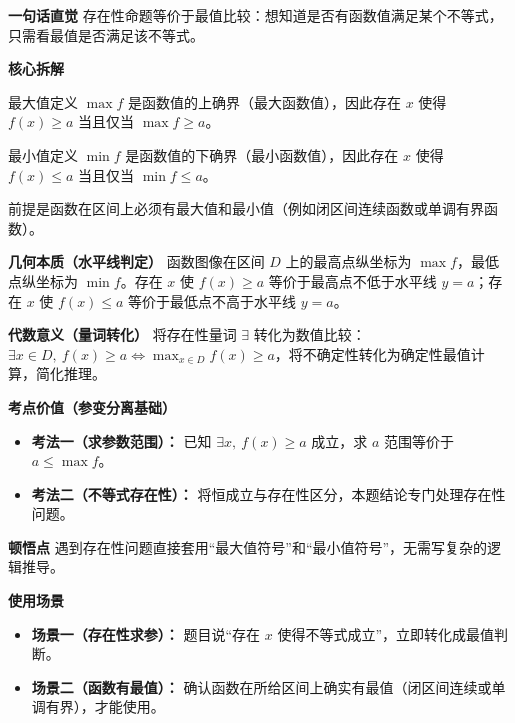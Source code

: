 \begin{explanationbox}
	\textbf{\textcolor{CExplanation}{一句话直觉}}
	存在性命题等价于最值比较：想知道是否有函数值满足某个不等式，只需看最值是否满足该不等式。

	\medskip
	\textbf{\textcolor{CExplanation}{核心拆解}}
	\begin{description}[style=nextline, leftmargin=2.8em, labelsep=0.5em, itemsep=0.45em]
		\item[\textbf{要点一（等价本质）：}]
			最大值定义 $\max f$ 是函数值的上确界（最大函数值），因此存在 $x$ 使得 $f(x)\ge a$ 当且仅当 $\max f\ge a$。
		\item[\textbf{要点二（对称关系）：}]
			最小值定义 $\min f$ 是函数值的下确界（最小函数值），因此存在 $x$ 使得 $f(x)\le a$ 当且仅当 $\min f\le a$。
		\item[\textbf{要点三（适用前提）：}]
			前提是函数在区间上必须有最大值和最小值（例如闭区间连续函数或单调有界函数）。
	\end{description}

	\medskip
	\textbf{\textcolor{CExplanation}{几何本质（水平线判定）}}
	函数图像在区间 $D$ 上的最高点纵坐标为 $\max f$，最低点纵坐标为 $\min f$。存在 $x$ 使 $f(x)\ge a$ 等价于最高点不低于水平线 $y=a$；存在 $x$ 使 $f(x)\le a$ 等价于最低点不高于水平线 $y=a$。

	\medskip
	\textbf{\textcolor{CExplanation}{代数意义（量词转化）}}
	将存在性量词 $\exists$ 转化为数值比较：$\exists x\in D,\ f(x)\ge a \iff \max_{x\in D}f(x)\ge a$，将不确定性转化为确定性最值计算，简化推理。

	\medskip
	\textbf{\textcolor{CExplanation}{考点价值（参变分离基础）}}
	\begin{itemize}[leftmargin=*, itemsep=0.5em, topsep=0.4em]
		\item \textbf{考法一（求参数范围）：} 已知 $\exists x,\ f(x)\ge a$ 成立，求 $a$ 范围等价于 $a\le \max f$。
		\item \textbf{考法二（不等式存在性）：} 将恒成立与存在性区分，本题结论专门处理存在性问题。
	\end{itemize}

	\medskip
	\textbf{\textcolor{CExplanation}{顿悟点}}
	遇到存在性问题直接套用“最大值符号”和“最小值符号”，无需写复杂的逻辑推导。

	\medskip
	\textbf{\textcolor{CExplanation}{使用场景}}
	\begin{itemize}[leftmargin=*, itemsep=0.5em, topsep=0.4em]
		\item \textbf{场景一（存在性求参）：} 题目说“存在 $x$ 使得不等式成立”，立即转化成最值判断。
		\item \textbf{场景二（函数有最值）：} 确认函数在所给区间上确实有最值（闭区间连续或单调有界），才能使用。
	\end{itemize}

\end{explanationbox}
